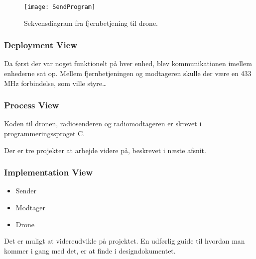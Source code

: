 \documentclass[Main]{subfiles}
\begin{document}
\begin{figure}[H]
\centering
\texttt{[image: SendProgram]}
\caption{Sekvensdiagram fra fjernbetjening til drone.}
\label{Fig:sendProgram}
\end{figure}

\subsubsection*{Deployment View}
Da først der var noget funktionelt på hver enhed, blev kommunikationen imellem enhederne sat op.
Mellem fjernbetjeningen og modtageren skulle der være en 433 MHz forbindelse, som ville styre\dots{}


\subsubsection*{Process View}
Koden til dronen, radiosenderen og radiomodtageren er skrevet i programmeringssproget C.

Der er tre projekter at arbejde videre på, beskrevet i næste afsnit.

\subsubsection*{Implementation View}
\begin{itemize}
\item Sender
\item Modtager
\item Drone
\end{itemize}

Det er muligt at videreudvikle på projektet.
En udførlig guide til hvordan man kommer i gang med det, er at finde i  designdokumentet\cite[afs. 2.4]{Design}.
\end{document}

